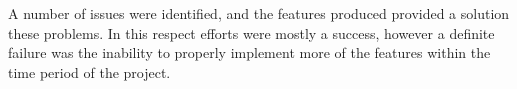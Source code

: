 \documentclass{l4proj}
\begin{document}
A number of issues were identified, and the features produced provided a solution these problems.  In this respect efforts were mostly a success, however a definite failure was the inability to properly implement more of the features within the time period of the project.



\begin{appendices}


\end{appendices}




\end{document}
